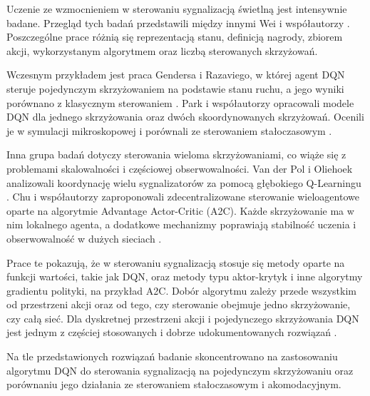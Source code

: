 Uczenie ze wzmocnieniem w sterowaniu sygnalizacją świetlną jest intensywnie badane. Przegląd tych badań przedstawili między innymi Wei i współautorzy \cite{wei2019survey}. Poszczególne prace różnią się reprezentacją stanu, definicją nagrody, zbiorem akcji, wykorzystanym algorytmem oraz liczbą sterowanych skrzyżowań.

Wczesnym przykładem jest praca Gendersa i Razaviego, w której agent DQN steruje pojedynczym skrzyżowaniem na podstawie stanu ruchu, a jego wyniki porównano z klasycznym sterowaniem \cite{genders2016using}. Park i współautorzy opracowali modele DQN dla jednego skrzyżowania oraz dwóch skoordynowanych skrzyżowań. Ocenili je w symulacji mikroskopowej i porównali ze sterowaniem stałoczasowym \cite{park2021deep}.

Inna grupa badań dotyczy sterowania wieloma skrzyżowaniami, co wiąże się z problemami skalowalności i częściowej obserwowalności. Van der Pol i Oliehoek analizowali koordynację wielu sygnalizatorów za pomocą głębokiego Q-Learningu \cite{vanderpol2016coordinated}. Chu i współautorzy zaproponowali zdecentralizowane sterowanie wieloagentowe oparte na algorytmie Advantage Actor-Critic (A2C). Każde skrzyżowanie ma w nim lokalnego agenta, a dodatkowe mechanizmy poprawiają stabilność uczenia i obserwowalność w dużych sieciach \cite{chu2020multiagent}.

Prace te pokazują, że w sterowaniu sygnalizacją stosuje się metody oparte na funkcji wartości, takie jak DQN, oraz metody typu aktor-krytyk i inne algorytmy gradientu polityki, na przykład A2C. Dobór algorytmu zależy przede wszystkim od przestrzeni akcji oraz od tego, czy sterowanie obejmuje jedno skrzyżowanie, czy całą sieć. Dla dyskretnej przestrzeni akcji i pojedynczego skrzyżowania DQN jest jednym z częściej stosowanych i dobrze udokumentowanych rozwiązań \cite{wei2019survey, genders2016using}.

Na tle przedstawionych rozwiązań badanie skoncentrowano na zastosowaniu algorytmu DQN do sterowania sygnalizacją na pojedynczym skrzyżowaniu oraz porównaniu jego działania ze sterowaniem stałoczasowym i akomodacyjnym.
